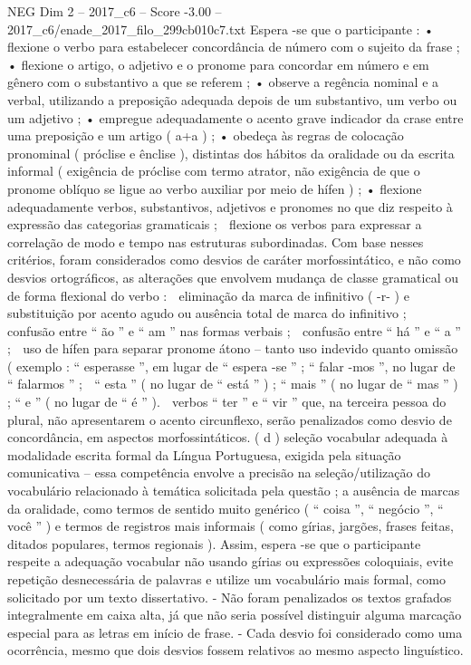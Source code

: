 \begin{textsample}{NEG Dim 2 – 2017\_c6 – Score -3.00 – 2017\_c6/enade\_2017\_filo\_299cb010c7.txt}
Espera -se que o participante : • flexione o verbo para estabelecer concordância de número com o sujeito da frase ; • flexione o artigo, o adjetivo e o pronome para concordar em número e em gênero com o substantivo a que se referem ; • observe a regência nominal e a verbal, utilizando a preposição adequada depois de um substantivo, um verbo ou um adjetivo ; • empregue adequadamente o acento grave indicador da crase entre uma preposição e um artigo ( a+a ) ; • obedeça às regras de colocação pronominal ( próclise e ênclise ), distintas dos hábitos da oralidade ou da escrita informal ( exigência de próclise com termo atrator, não exigência de que o pronome oblíquo se ligue ao verbo auxiliar por meio de hífen ) ; • flexione adequadamente verbos, substantivos, adjetivos e pronomes no que diz respeito à expressão das categorias gramaticais ;  flexione os verbos para expressar a correlação de modo e tempo nas estruturas subordinadas.
Com base nesses critérios, foram considerados como desvios de caráter morfossintático, e não como desvios ortográficos, as alterações que envolvem mudança de classe gramatical ou de forma flexional do verbo :  eliminação da marca de infinitivo ( -r- ) e substituição por acento agudo ou ausência total de marca do infinitivo ;  confusão entre “ ão ” e “ am ” nas formas verbais ;  confusão entre “ há ” e “ a ” ;  uso de hífen para separar pronome átono – tanto uso indevido quanto omissão ( exemplo : “ esperasse ”, em lugar de “ espera -se ” ; “ falar -mos ”, no lugar de “ falarmos ” ;  “ esta ” ( no lugar de “ está ” ) ; “ mais ” ( no lugar de “ mas ” ) ; “ e ” ( no lugar de “ é ” ).  verbos “ ter ” e “ vir ” que, na terceira pessoa do plural, não apresentarem o acento circunflexo, serão penalizados como desvio de concordância, em aspectos morfossintáticos. ( d ) seleção vocabular adequada à modalidade escrita formal da Língua Portuguesa, exigida pela situação comunicativa – essa competência envolve a precisão na seleção/utilização do vocabulário relacionado à temática solicitada pela questão ; a ausência de marcas da oralidade, como termos de sentido muito genérico ( “ coisa ”, “ negócio ”, “ você ” ) e termos de registros mais informais ( como gírias, jargões, frases feitas, ditados populares, termos regionais ).
Assim, espera -se que o participante respeite a adequação vocabular não usando gírias ou expressões coloquiais, evite repetição desnecessária de palavras e utilize um vocabulário mais formal, como solicitado por um texto dissertativo. - Não foram penalizados os textos grafados integralmente em caixa alta, já que não seria possível distinguir alguma marcação especial para as letras em início de frase. - Cada desvio foi considerado como uma ocorrência, mesmo que dois desvios fossem relativos ao mesmo aspecto linguístico.

\end{textsample}
